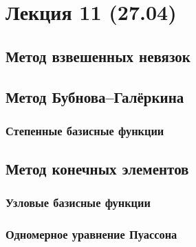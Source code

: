 \section{Лекция 11 (27.04)}
\subsection{Метод взвешенных невязок}
\subsection{Метод Бубнова--Галёркина}
\subsubsection{Степенные базисные функции}
\subsection{Метод конечных элементов}
\subsubsection{Узловые базисные функции}
\subsubsection{Одномерное уравнение Пуассона}
